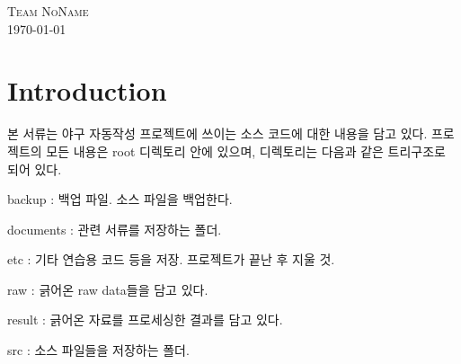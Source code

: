 \documentclass[twoside]{article}
\begin{document}
\begin{titlepage}
\textsc{Team NoName}\\[1.5cm] %


{\large \today}\\[3cm] %



 


\end{titlepage}


\tableofcontents
\newpage



\section{Introduction}

본 서류는 야구 자동작성 프로젝트에 쓰이는 소스 코드에 대한 내용을 담고 있다. 프로젝트의 모든 내용은 root 디렉토리 안에 있으며, 디렉토리는 다음과 같은 트리구조로 되어 있다. 

\begin{compactitem}
\item backup : 백업 파일. 소스 파일을 백업한다. 
\item documents : 관련 서류를 저장하는 폴더. 
\item etc : 기타 연습용 코드 등을 저장. 프로젝트가 끝난 후 지울 것. 
\item raw : 긁어온 raw data들을 담고 있다. 
\item result : 긁어온 자료를 프로세싱한 결과를 담고 있다. 
\item src : 소스 파일들을 저장하는 폴더. 
\end{compactitem}
\end{document}
